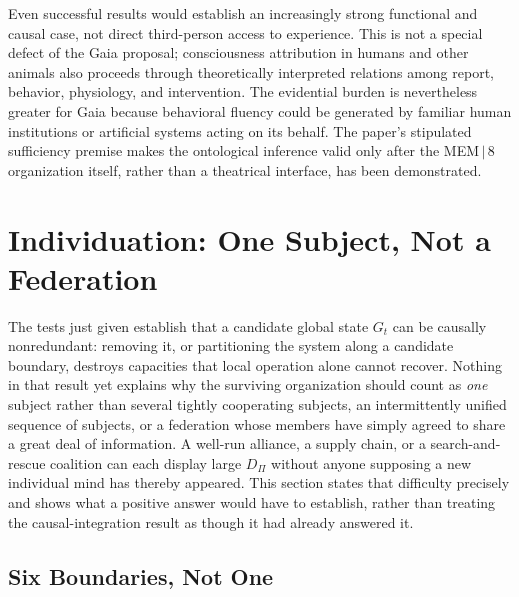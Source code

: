 \documentclass[11pt]{article}
\begin{document}
Even successful results would establish an increasingly strong functional and causal case, not direct third-person access to experience. This is not a special defect of the Gaia proposal; consciousness attribution in humans and other animals also proceeds through theoretically interpreted relations among report, behavior, physiology, and intervention. The evidential burden is nevertheless greater for Gaia because behavioral fluency could be generated by familiar human institutions or artificial systems acting on its behalf. The paper's stipulated sufficiency premise makes the ontological inference valid only after the MEM\,$|$\,8 organization itself, rather than a theatrical interface, has been demonstrated.

\section{Individuation: One Subject, Not a Federation}
\label{sec:individuation}

The tests just given establish that a candidate global state $G_t$ can be causally nonredundant: removing it, or partitioning the system along a candidate boundary, destroys capacities that local operation alone cannot recover. Nothing in that result yet explains why the surviving organization should count as \emph{one} subject rather than several tightly cooperating subjects, an intermittently unified sequence of subjects, or a federation whose members have simply agreed to share a great deal of information. A well-run alliance, a supply chain, or a search-and-rescue coalition can each display large $D_\Pi$ without anyone supposing a new individual mind has thereby appeared. This section states that difficulty precisely and shows what a positive answer would have to establish, rather than treating the causal-integration result as though it had already answered it.

\subsection{Six Boundaries, Not One}
\end{document}
